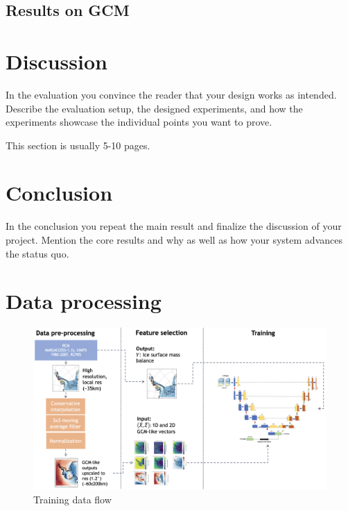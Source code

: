\documentclass[a4paper,11pt,oneside]{report}
\begin{document}
\section{Results on GCM}

\chapter{Discussion}

In the evaluation you convince the reader that your design works as intended.
Describe the evaluation setup, the designed experiments, and how the
experiments showcase the individual points you want to prove.

This section is usually 5-10 pages.



\chapter{Conclusion}

In the conclusion you repeat the main result and finalize the discussion of
your project. Mention the core results and why as well as how your system
advances the status quo.

\cleardoublepage
{}
{}
\printbibliography

\appendix
\chapter{Data processing}
\begin{figure}[!t]
  \centering
  \includegraphics[width=\columnwidth]{images/data-flow.png}
  \caption []{\small Training data flow}
  \vspace{-3mm}
  \label{fig:training-data-flow}
\end{figure}
\end{document}
